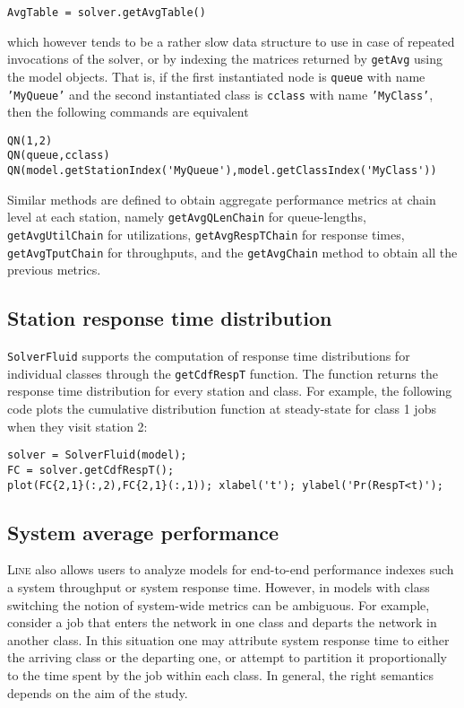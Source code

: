 \begin{lstlisting}
AvgTable = solver.getAvgTable()
\end{lstlisting}
which however tends to be a rather slow data structure to use in case of repeated invocations of the solver, or by indexing the matrices returned by \texttt{getAvg} using the model objects. That is, if the first instantiated node is \texttt{queue} with name \texttt{'MyQueue'} and the second instantiated class is \texttt{cclass} with name \texttt{'MyClass'}, then the following commands are equivalent
\begin{lstlisting}
QN(1,2)
QN(queue,cclass)
QN(model.getStationIndex('MyQueue'),model.getClassIndex('MyClass'))
\end{lstlisting}
Similar methods are defined to obtain aggregate performance metrics at chain level at each station, namely \texttt{getAvgQLenChain} for queue-lengths, \texttt{getAvgUtilChain} for utilizations, \texttt{getAvgRespTChain} for response times, \texttt{getAvgTputChain} for throughputs, and the \texttt{getAvgChain} method to obtain all the previous metrics.

\subsection{Station response time distribution}
\texttt{SolverFluid} supports the computation of response time distributions for individual classes through the \texttt{getCdfRespT} function. The function returns the response time distribution for every station and class. For example, the following code plots the cumulative distribution function at steady-state for class 1 jobs when they visit station 2:
\begin{lstlisting}
solver = SolverFluid(model);
FC = solver.getCdfRespT();
plot(FC{2,1}(:,2),FC{2,1}(:,1)); xlabel('t'); ylabel('Pr(RespT<t)');
\end{lstlisting}

\subsection{System average performance}
\textsc{Line} also allows users to analyze models for end-to-end performance indexes such a system throughput or system response time. However, in models with class switching the notion of system-wide metrics can be ambiguous. For example, consider a job that enters the network in one class and departs the network in another class. In this situation one may attribute system response time to either the arriving class or the departing one, or attempt to partition it proportionally to the time spent by the job within each class. In general, the right semantics depends on the aim of the study.

